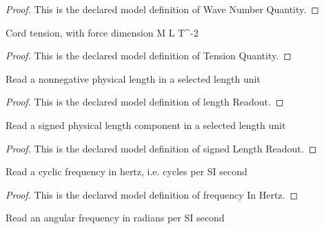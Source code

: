 \begin{proof}
  This is the declared model definition of Wave Number Quantity.
\end{proof}
\begin{definition}
  \label{def:physics:phyx-mini-0303:phyxminiproblems-problemphyxmini0303-tensionquantity}
  Cord tension, with force dimension M L T\textasciicircum{}-2
\end{definition}
\begin{proof}
  This is the declared model definition of Tension Quantity.
\end{proof}
\begin{definition}
  \label{def:physics:phyx-mini-0303:phyxminiproblems-problemphyxmini0303-lengthreadout}
  Read a nonnegative physical length in a selected length unit
\end{definition}
\begin{proof}
  This is the declared model definition of length Readout.
\end{proof}
\begin{definition}
  \label{def:physics:phyx-mini-0303:phyxminiproblems-problemphyxmini0303-signedlengthreadout}
  Read a signed physical length component in a selected length unit
\end{definition}
\begin{proof}
  This is the declared model definition of signed Length Readout.
\end{proof}
\begin{definition}
  \label{def:physics:phyx-mini-0303:phyxminiproblems-problemphyxmini0303-frequencyinhertz}
  Read a cyclic frequency in hertz, i.e. cycles per SI second
\end{definition}
\begin{proof}
  This is the declared model definition of frequency In Hertz.
\end{proof}
\begin{definition}
  \label{def:physics:phyx-mini-0303:phyxminiproblems-problemphyxmini0303-angularfrequencyinradianspersecond}
  Read an angular frequency in radians per SI second
\end{definition}
